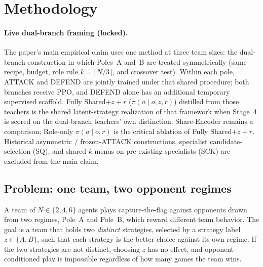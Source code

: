 
\section{Methodology}
\label{sec:method-suite}

\paragraph{Live dual-branch framing (locked).}
The paper's main empirical claim uses one method at three team sizes: the
dual-branch construction in which Poles~A and~B are treated symmetrically
(same recipe, budget, role rule \(k=\lceil N/3\rceil\), and crossover test).
Within each pole, ATTACK and DEFEND are jointly trained under that shared
procedure; both branches receive PPO, and DEFEND alone has an additional
temporary supervised scaffold. Fully Shared+\(z+r\) (\(\pi(a\mid o,z,r)\))
distilled from those teachers is the shared latent-strategy realization of
that framework when Stage~4 is scored on the dual-branch teachers' own
distinction. Share-Encoder remains a comparison; Role-only \(\pi(a\mid o,r)\)
is the critical ablation of Fully Shared+\(z+r\). Historical asymmetric /
frozen-ATTACK constructions, specialist candidate-selection (SQ), and
shared-\(k\) menus on pre-existing specialists (SCK) are excluded from the
main claim.

\subsection{Problem: one team, two opponent regimes}
\label{sec:method-problem}

A team of \(N\in\{2,4,6\}\) agents plays capture-the-flag against opponents
drawn from two regimes, Pole~A and Pole~B, which reward different team
behavior. The goal is a team that holds two \emph{distinct} strategies,
selected by a strategy label \(z\in\{A,B\}\), such that each strategy is the
better choice against its own regime. If the two strategies are not distinct,
choosing \(z\) has no effect, and opponent-conditioned play is impossible
regardless of how many games the team wins.

